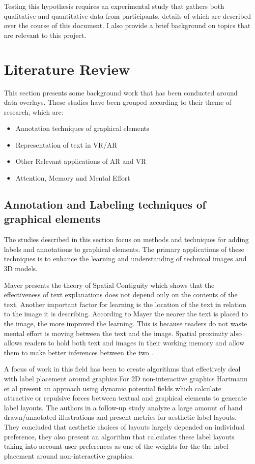 \documentclass{article}
\begin{document}
Testing this hypothesis requires an experimental study that gathers both qualitative and quantitative data from participants, details of which are described over the course of this document. I also provide a brief background on topics that are relevant to this project. 

\section{Literature Review} \label{LitReview}
This section presents some background work that has been conducted around data overlays. These studies have been grouped according to their theme of research, which are: 
\begin{itemize}
\item Annotation techniques of graphical elements
\item Representation of text in VR/AR
\item Other Relevant applications  of AR and VR
\item Attention, Memory and Mental Effort
\end{itemize}

\subsection{Annotation and Labeling techniques of graphical elements} \label{Labels}
The studies described in this section focus on methods and techniques for adding labels and annotations to graphical elements. The primary applications of these techniques is to enhance the learning and understanding of technical images and 3D models.

Mayer \cite{mayer2002multimedia} presents the theory of Spatial Contiguity which shows that the effectiveness of text explanations does not depend only on the contents of the text. Another important factor for learning is the location of the text in relation to the image it is describing. According to Mayer the nearer the text is placed to the image, the more improved the learning. This is because readers do not waste mental effort is moving between the text and the image. Spatial proximity also allows readers to hold both text and images in their working memory and allow them to make better inferences between the two \cite{mayer2002multimedia}. 

A focus of work in this field has been to create algorithms that effectively deal with label placement around graphics.For 2D non-interactive graphics Hartmann et al \cite{Hartmann2004} present an approach using dynamic potential fields which calculate attractive or repulsive forces between textual and graphical elements to generate label layouts. 
The authors in a follow-up study \cite{Hartmann2005b} analyze a large amount of hand drawn/annotated illustrations and present metrics for aesthetic label layouts. They concluded that aesthetic choices of layouts largely depended on individual preference, they also present an algorithm that calculates these label layouts taking into account user preferences as one of the weights for the the label placement around non-interactive graphics. 
\end{document}
